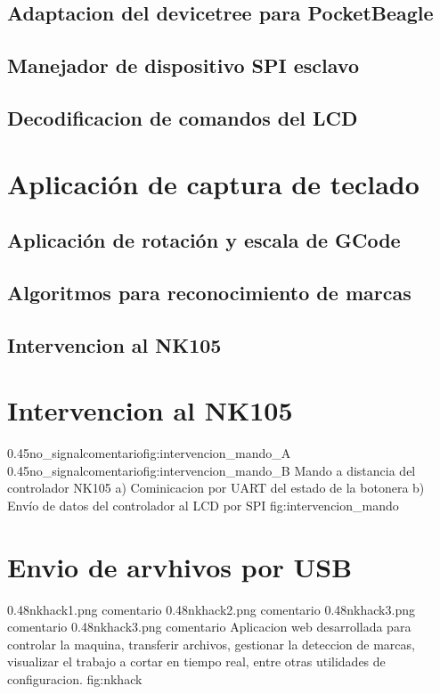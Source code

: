    \subsection{Adaptacion del devicetree para PocketBeagle}
   \subsection{Manejador de dispositivo SPI esclavo}
   \subsection{Decodificacion de comandos del LCD}
\section{Aplicación de captura de teclado}
\subsection{Aplicación de rotación y escala de GCode}
\subsection{Algoritmos para reconocimiento de marcas}

\subsection{Intervencion al NK105}

\section{Intervencion al NK105}

\subfigab
   {0.45}{no_signal}{comentario}{fig:intervencion_mando_A}
   {0.45}{no_signal}{comentario}{fig:intervencion_mando_B}
         {Mando a distancia del controlador NK105 a) Cominicacion por UART del estado de la botonera b) Envío de datos del controlador al LCD por SPI}
         {fig:intervencion_mando}


\section{Envio de arvhivos por USB}

\subfigtwotwo
         {0.48}{nkhack1.png} {comentario}
         {0.48}{nkhack2.png} {comentario}
         {0.48}{nkhack3.png} {comentario}
         {0.48}{nkhack3.png} {comentario}
         {Aplicacion web desarrollada para controlar la maquina, transferir archivos, gestionar la deteccion de marcas, visualizar el trabajo a cortar en tiempo real, entre otras utilidades de configuracion.}
         {fig:nkhack}
